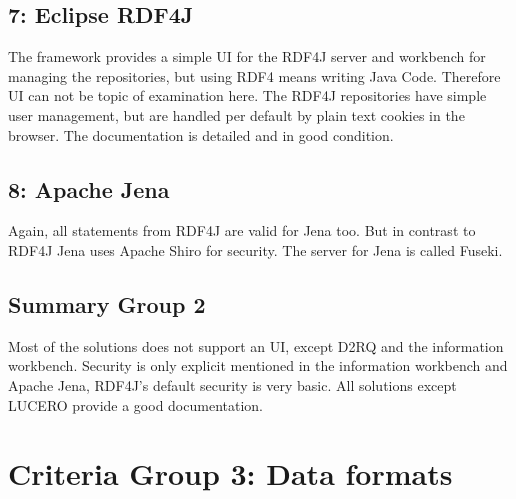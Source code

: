 \subsection*{7: Eclipse RDF4J}
The framework provides a simple UI for the RDF4J server and workbench for managing the repositories, but using RDF4 means writing Java Code. Therefore UI can not be topic of examination here. The RDF4J repositories have simple user management, but are handled per default by plain text cookies in the browser. The documentation is detailed and in good condition.

\subsection*{8: Apache Jena}
Again, all statements from RDF4J are valid for Jena too. But in contrast to RDF4J Jena uses Apache Shiro for security. The server for Jena is called Fuseki.

\subsection{Summary Group 2}
Most of the solutions does not support an UI, except D2RQ and the information workbench. Security is only explicit mentioned in the information workbench and Apache Jena, RDF4J's default security is very basic. All solutions except LUCERO provide a good documentation.

\section{Criteria Group 3: Data formats}

